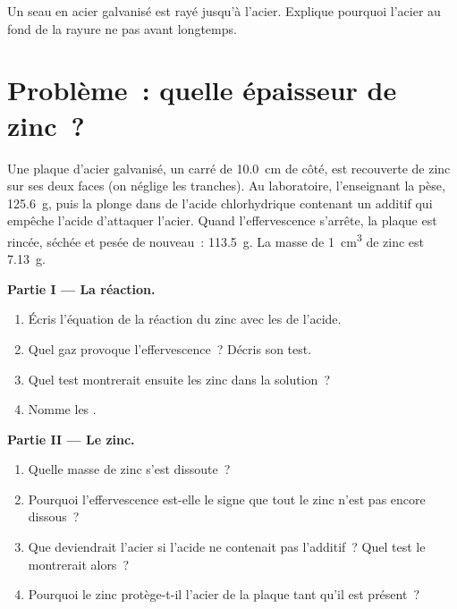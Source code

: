 \begin{exercise}[$\star\star\star$]\label{exo:g9:metals-acids-corrosion:12}
Un seau en acier galvanisé est rayé jusqu'à l'acier. Explique pourquoi
l'acier au fond de la rayure ne  pas avant longtemps.
\end{exercise}

\section{Problème~: quelle épaisseur de zinc~?}

\begin{problem}
\label{pb:g9:metals-acids-corrosion:1}
Une plaque d'acier galvanisé, un carré de \qty{10.0}{cm} de côté, est
recouverte de zinc sur ses deux faces (on néglige les tranches). Au
laboratoire, l'enseignant la pèse, \qty{125.6}{g}, puis la plonge dans
de l'acide chlorhydrique contenant un additif qui empêche l'acide
d'attaquer l'acier. Quand l'effervescence s'arrête, la plaque est
rincée, séchée et pesée de nouveau~: \qty{113.5}{g}. La masse de
\qty{1}{cm^3} de zinc est \qty{7.13}{g}.

\medskip
\noindent\textbf{Partie I --- La réaction.}
\begin{enumerate}
  \item Écris l'équation de la réaction du zinc avec les   de
        l'acide.
  \item Quel gaz provoque l'effervescence~? Décris son test.
  \item Quel test montrerait ensuite les  zinc dans la solution~?
  \item Nomme les .
\end{enumerate}

\medskip
\noindent\textbf{Partie II --- Le zinc.}
\begin{enumerate}[resume]
  \item Quelle masse de zinc s'est dissoute~?
  \item Pourquoi l'effervescence est-elle le signe que tout le zinc n'est
        pas encore dissous~?
  \item Que deviendrait l'acier si l'acide ne contenait pas l'additif~?
        Quel test le montrerait alors~?
  \item Pourquoi le zinc protège-t-il l'acier de la plaque tant qu'il est
        présent~?
\end{enumerate}


\end{problem}
